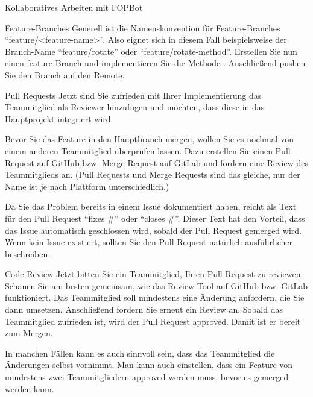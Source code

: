 \documentclass[
    english, accentcolor=TUDa-1c,
    fontsize= 12pt, a4paper, aspectratio=169, colorback=true, fancy_row_colors, boxarc=3pt,
]{algoexercise}
\begin{document}
\begin{task}{Kollaboratives Arbeiten mit FOPBot}
\begin{subtask*}[points=0]{Feature-Branches}
            Generell ist die Namenskonvention für Feature-Branches \enquote{feature/<feature-name>}.
            Also eignet sich in diesem Fall beispielsweise der Branch-Name \enquote{feature/rotate} oder \enquote{feature/rotate-method}.
            Erstellen Sie nun einen feature-Branch und implementieren Sie die Methode .
            Anschließend pushen Sie den Branch auf den Remote.
        \end{subtask*}
        \begin{subtask*}[points=0]{Pull Requests}
            Jetzt sind Sie zufrieden mit Ihrer Implementierung das Teammitglied als Reviewer hinzufügen und möchten, dass diese in das
            Hauptprojekt integriert wird.

            Bevor Sie das Feature in den Hauptbranch mergen, wollen Sie es nochmal von einem anderen Teammitglied überprüfen lassen.
            Dazu erstellen Sie einen Pull Request auf GitHub bzw.
            Merge Request auf GitLab und fordern eine Review des Teammitglieds an.
            (Pull Requests und Merge Requests sind das gleiche, nur der Name ist je nach Plattform unterschiedlich.)

            \begin{hinweis}
                Da Sie das Problem bereits in einem Issue dokumentiert haben, reicht als Text für den Pull Request \enquote{fixes
                    \#<issue-number>} oder \enquote{closes \#<issue-number>}.
                Dieser Text hat den Vorteil, dass das Issue automatisch geschlossen wird, sobald der Pull Request gemerged wird.
                Wenn kein Issue existiert, sollten Sie den Pull Request natürlich ausführlicher beschreiben.
            \end{hinweis}
        \end{subtask*}
        \begin{subtask*}[points=0]{Code Review}
            Jetzt bitten Sie ein Teammitglied, Ihren Pull Request zu reviewen.
            Schauen Sie am besten gemeinsam, wie das Review-Tool auf GitHub bzw.
            GitLab funktioniert.
            Das Teammitglied soll mindestens eine Änderung anfordern, die Sie dann umsetzen.
            Anschließend fordern Sie erneut ein Review an.
            Sobald das Teammitglied zufrieden ist, wird der Pull Request approved.
            Damit ist er bereit zum Mergen.

            \begin{anmerkung}
                In manchen Fällen kann es auch sinnvoll sein, dass das Teammitglied die Änderungen selbst vornimmt.
                Man kann auch einstellen, dass ein Feature von mindestens zwei Teammitgliedern approved werden muss, bevor es gemerged werden
                kann.
            \end{anmerkung}
        \end{subtask*}
    \end{task}
\end{document}
